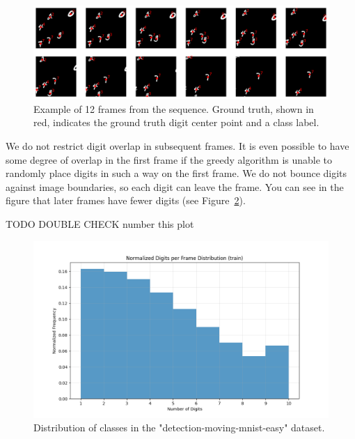 \begin{figure}
    \centering
    \includegraphics[width=\textwidth]{figures/figure_methods_dataset_detection_mmnist_sequence.png}
    \caption{Example of 12 frames from the sequence. Ground truth, shown in red, indicates the ground truth digit center point and a class label.}
    \label{fig:figure_methods_dataset_detection_mmnist_sequence}
\end{figure}



We do not restrict digit overlap in subsequent frames. It is even possible to have some degree of overlap in the first frame if the greedy algorithm is unable to randomly place digits in such a way on the first frame.
We do not bounce digits against image boundaries, so each digit can leave the frame. You can see in the figure that later frames have fewer digits (see Figure~\ref{fig:figure_method_dataset_train_digits_per_frame}).

TODO DOUBLE CHECK number this plot
\begin{figure}
    \centering
    \includegraphics[width=\textwidth]{figures/figure_method_dataset_train_digits_per_frame.png}
    \caption{Distribution of classes in the "detection-moving-mnist-easy" dataset.}
    \label{fig:figure_method_dataset_train_digits_per_frame}
\end{figure}


